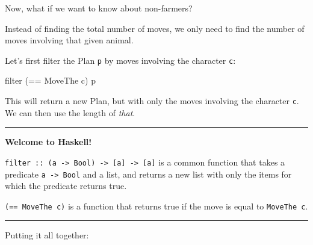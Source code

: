 \documentclass[]{article}
\newenvironment{Shaded}{}{}
\newcommand{\DataTypeTok}[1]{\textcolor[rgb]{0.56,0.13,0.00}{#1}}
\newcommand{\FunctionTok}[1]{\textcolor[rgb]{0.02,0.16,0.49}{#1}}
\newcommand{\KeywordTok}[1]{\textcolor[rgb]{0.00,0.44,0.13}{\textbf{#1}}}
\newcommand{\NormalTok}[1]{#1}
\newcommand{\OtherTok}[1]{\textcolor[rgb]{0.00,0.44,0.13}{#1}}
\begin{document}
Now, what if we want to know about non-farmers?

Instead of finding the total number of moves, we only need to find the number of
moves involving that given animal.

Let's first filter the Plan \texttt{p} by moves involving the character
\texttt{c}:

\begin{Shaded}
\begin{Highlighting}[]
\NormalTok{filter (}\FunctionTok{==} \DataTypeTok{MoveThe}\NormalTok{ c) p}
\end{Highlighting}
\end{Shaded}

This will return a new Plan, but with only the moves involving the character
\texttt{c}. We can then use the length of \emph{that}.

\begin{center}\rule{0.5\linewidth}{\linethickness}\end{center}

\textbf{Welcome to Haskell!}

\texttt{filter\ ::\ (a\ -\textgreater{}\ Bool)\ -\textgreater{}\ {[}a{]}\ -\textgreater{}\ {[}a{]}}
is a common function that takes a predicate \texttt{a\ -\textgreater{}\ Bool}
and a list, and returns a new list with only the items for which the predicate
returns true.

\texttt{(==\ MoveThe\ c)} is a function that returns true if the move is equal
to \texttt{MoveThe\ c}.

\begin{center}\rule{0.5\linewidth}{\linethickness}\end{center}

Putting it all together:

\begin{Shaded}
\end{Shaded}
\end{document}
